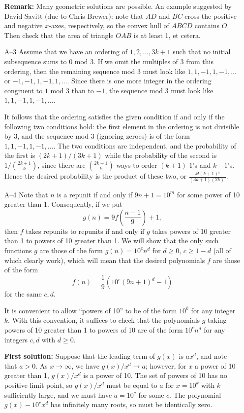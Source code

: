 \documentclass[amssymb,twocolumn,pra,10pt,aps]{revtex4-1}
\begin{document}
\begin{itemize}
\textbf{Remark:}
Many geometric solutions are possible. An example suggested by David Savitt
(due to Chris Brewer):
note that $AD$ and $BC$ cross the
positive and negative $x$-axes, respectively, so the convex hull of $ABCD$
contains $O$. Then check that the area of triangle $OAB$ is at least 1, et cetera.


\item[A--3]
Assume that we have an ordering of $1,2,\dots,3k+1$ such
  that no initial subsequence sums to $0$ mod $3$. If we omit the
  multiples of $3$ from this ordering, then the remaining sequence mod
  $3$ must look like $1,1,-1,1,-1,\ldots$ or $-1,-1,1,-1,1,\ldots$.
  Since there is one more integer in the ordering congruent to $1$ mod
  $3$ than to $-1$, the sequence mod $3$ must look like
  $1,1,-1,1,-1,\ldots$.

  It follows that the ordering satisfies the given condition if and
  only if the following two conditions hold: the first element in the
  ordering is not divisible by $3$, and the sequence mod $3$ (ignoring
zeroes) is of the form $1,1,-1,1,-1,\ldots$. The two conditions are
  independent, and the probability of the first is $(2k+1)/(3k+1)$
while the probability of the second is
$1/\binom{2k+1}{k}$,
  since there are $\binom{2k+1}{k}$ ways to order $(k+1)$ $1$'s and $k$
  $-1$'s.
  Hence the desired probability is the product of these two, or
  $\frac{k!(k+1)!}{(3k+1)(2k)!}$.

\item[A--4]
Note that $n$ is a repunit if and only if $9n+1 = 10^m$ for some power of
10 greater than 1. Consequently, if we put
\[
g(n) = 9f\left( \frac{n-1}{9} \right) + 1,
\]
then $f$ takes repunits to repunits if and only if $g$ takes powers of 10
greater than 1 to powers of 10 greater than 1. We will show that the only
such functions $g$ are those of the form $g(n) = 10^c n^d$ for $d \geq 0$,
$c \geq 1-d$ (all of which clearly work),
which will mean that the desired polynomials $f$ are those of the form
\[
f(n) = \frac{1}{9}(10^c (9n+1)^d - 1)
\]
for the same $c,d$.

It is convenient to allow ``powers of 10'' to be of the form
$10^k$ for any integer $k$. With this convention, it suffices to check that
the polynomials $g$ taking powers of 10 greater than 1 to powers of 10
are of the form $10^c n^d$ for any integers $c,d$ with $d \geq 0$.

\textbf{First solution:}
Suppose that the leading term of $g(x)$ is $ax^d$, and note that
$a>0$. As $x \to \infty$, we have $g(x)/x^d \to a$; however, for $x$
a power of 10 greater than 1, $g(x)/x^d$ is a power of 10.
The set of powers of 10 has no positive limit point, so $g(x)/x^d$
must be equal to $a$ for $x = 10^k$ with $k$ sufficiently large,
and we must have $a = 10^c$ for some $c$.
The polynomial $g(x) - 10^c x^d$ has infinitely many roots, so
must be identically zero.


\end{itemize}
\end{document}
